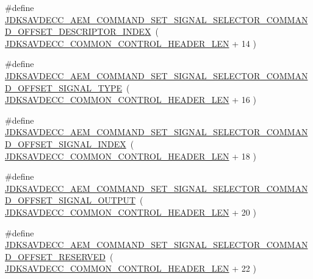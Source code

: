 \begin{DoxyCompactItemize}
\item 
\#define \hyperlink{group__command__set__signal__selector_ga9fc3bba977c421f1c66b23bc79d6b17e}{J\+D\+K\+S\+A\+V\+D\+E\+C\+C\+\_\+\+A\+E\+M\+\_\+\+C\+O\+M\+M\+A\+N\+D\+\_\+\+S\+E\+T\+\_\+\+S\+I\+G\+N\+A\+L\+\_\+\+S\+E\+L\+E\+C\+T\+O\+R\+\_\+\+C\+O\+M\+M\+A\+N\+D\+\_\+\+O\+F\+F\+S\+E\+T\+\_\+\+D\+E\+S\+C\+R\+I\+P\+T\+O\+R\+\_\+\+I\+N\+D\+EX}~( \hyperlink{group__jdksavdecc__avtp__common__control__header_gaae84052886fb1bb42f3bc5f85b741dff}{J\+D\+K\+S\+A\+V\+D\+E\+C\+C\+\_\+\+C\+O\+M\+M\+O\+N\+\_\+\+C\+O\+N\+T\+R\+O\+L\+\_\+\+H\+E\+A\+D\+E\+R\+\_\+\+L\+EN} + 14 )
\item 
\#define \hyperlink{group__command__set__signal__selector_ga8ab27e7a4bac1388edd85b38a7e00b01}{J\+D\+K\+S\+A\+V\+D\+E\+C\+C\+\_\+\+A\+E\+M\+\_\+\+C\+O\+M\+M\+A\+N\+D\+\_\+\+S\+E\+T\+\_\+\+S\+I\+G\+N\+A\+L\+\_\+\+S\+E\+L\+E\+C\+T\+O\+R\+\_\+\+C\+O\+M\+M\+A\+N\+D\+\_\+\+O\+F\+F\+S\+E\+T\+\_\+\+S\+I\+G\+N\+A\+L\+\_\+\+T\+Y\+PE}~( \hyperlink{group__jdksavdecc__avtp__common__control__header_gaae84052886fb1bb42f3bc5f85b741dff}{J\+D\+K\+S\+A\+V\+D\+E\+C\+C\+\_\+\+C\+O\+M\+M\+O\+N\+\_\+\+C\+O\+N\+T\+R\+O\+L\+\_\+\+H\+E\+A\+D\+E\+R\+\_\+\+L\+EN} + 16 )
\item 
\#define \hyperlink{group__command__set__signal__selector_ga4112880d653cb524237e550d00770fb7}{J\+D\+K\+S\+A\+V\+D\+E\+C\+C\+\_\+\+A\+E\+M\+\_\+\+C\+O\+M\+M\+A\+N\+D\+\_\+\+S\+E\+T\+\_\+\+S\+I\+G\+N\+A\+L\+\_\+\+S\+E\+L\+E\+C\+T\+O\+R\+\_\+\+C\+O\+M\+M\+A\+N\+D\+\_\+\+O\+F\+F\+S\+E\+T\+\_\+\+S\+I\+G\+N\+A\+L\+\_\+\+I\+N\+D\+EX}~( \hyperlink{group__jdksavdecc__avtp__common__control__header_gaae84052886fb1bb42f3bc5f85b741dff}{J\+D\+K\+S\+A\+V\+D\+E\+C\+C\+\_\+\+C\+O\+M\+M\+O\+N\+\_\+\+C\+O\+N\+T\+R\+O\+L\+\_\+\+H\+E\+A\+D\+E\+R\+\_\+\+L\+EN} + 18 )
\item 
\#define \hyperlink{group__command__set__signal__selector_ga7c95a215ae574070ed11b812779f2cbb}{J\+D\+K\+S\+A\+V\+D\+E\+C\+C\+\_\+\+A\+E\+M\+\_\+\+C\+O\+M\+M\+A\+N\+D\+\_\+\+S\+E\+T\+\_\+\+S\+I\+G\+N\+A\+L\+\_\+\+S\+E\+L\+E\+C\+T\+O\+R\+\_\+\+C\+O\+M\+M\+A\+N\+D\+\_\+\+O\+F\+F\+S\+E\+T\+\_\+\+S\+I\+G\+N\+A\+L\+\_\+\+O\+U\+T\+P\+UT}~( \hyperlink{group__jdksavdecc__avtp__common__control__header_gaae84052886fb1bb42f3bc5f85b741dff}{J\+D\+K\+S\+A\+V\+D\+E\+C\+C\+\_\+\+C\+O\+M\+M\+O\+N\+\_\+\+C\+O\+N\+T\+R\+O\+L\+\_\+\+H\+E\+A\+D\+E\+R\+\_\+\+L\+EN} + 20 )
\item 
\#define \hyperlink{group__command__set__signal__selector_ga70ecee155d945fb2044f1cdcfacac751}{J\+D\+K\+S\+A\+V\+D\+E\+C\+C\+\_\+\+A\+E\+M\+\_\+\+C\+O\+M\+M\+A\+N\+D\+\_\+\+S\+E\+T\+\_\+\+S\+I\+G\+N\+A\+L\+\_\+\+S\+E\+L\+E\+C\+T\+O\+R\+\_\+\+C\+O\+M\+M\+A\+N\+D\+\_\+\+O\+F\+F\+S\+E\+T\+\_\+\+R\+E\+S\+E\+R\+V\+ED}~( \hyperlink{group__jdksavdecc__avtp__common__control__header_gaae84052886fb1bb42f3bc5f85b741dff}{J\+D\+K\+S\+A\+V\+D\+E\+C\+C\+\_\+\+C\+O\+M\+M\+O\+N\+\_\+\+C\+O\+N\+T\+R\+O\+L\+\_\+\+H\+E\+A\+D\+E\+R\+\_\+\+L\+EN} + 22 )

\end{DoxyCompactItemize}
